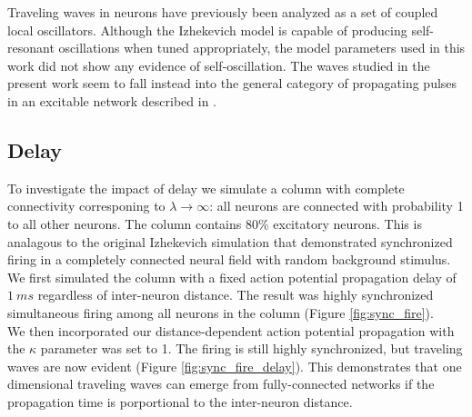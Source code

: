 \documentclass[a4paper,11pt]{article}
\begin{document}
Traveling waves in neurons have previously been analyzed as a set of coupled local oscillators.
Although the Izhekevich model is capable of producing self-resonant oscillations when tuned appropriately, the model parameters used in this work did not show any evidence of self-oscillation.
The waves studied in the present work seem to fall instead into the general category of propagating pulses in an excitable network described in \cite{ermentrout2001}. 

\subsection{Delay}
To investigate the impact of delay we simulate a column with complete connectivity corresponing to $\lambda \rightarrow \infty$: all neurons are connected with probability 1 to all other neurons.
The column contains $80\%$ excitatory neurons.
This is analagous to the original Izhekevich simulation \cite{izzy_code} that demonstrated synchronized firing in a completely connected neural field with random background stimulus.
We first simulated the column with a fixed action potential propagation delay of $1~ms$ regardless of inter-neuron distance.
The result was highly synchronized simultaneous firing among all neurons in the column (Figure \ref{fig:sync_fire}). \\ 
We then incorporated our distance-dependent action potential propagation with the $\kappa$ parameter was set to 1.
The firing is still highly synchronized, but traveling waves are now evident (Figure \ref{fig:sync_fire_delay}).
This demonstrates that one dimensional traveling waves can emerge from fully-connected networks if the propagation time is porportional to the inter-neuron distance.
\end{document}
